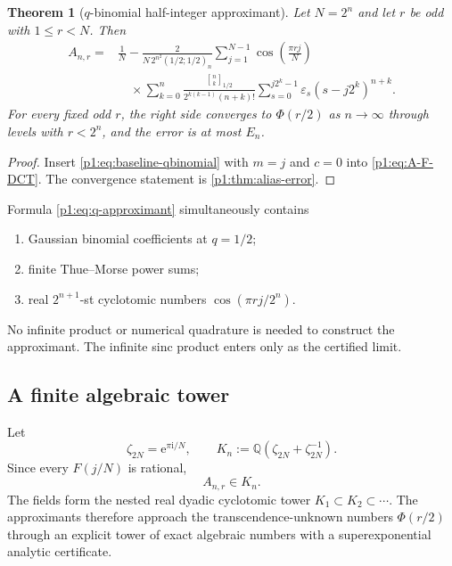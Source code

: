 \documentclass[11pt,oneside]{article}
\newtheorem{theorem}{Theorem}[section]
\theoremstyle{definition}
\theoremstyle{remark}
\newcommand{\Q}{\mathbb Q}
\newcommand{\e}{\mathrm e}
\newcommand{\ii}{\mathrm i}
\newcommand{\eps}{\varepsilon}
\newcommand{\PhiU}{\Phi}
\newcommand{\qbinom}[3]{\genfrac{[}{]}{0pt}{}{#1}{#2}_{#3}}
\begin{document}
\begin{theorem}[$q$-binomial half-integer approximant]\label{p1:thm:q-approximant}
Let $N=2^n$ and let $r$ be odd with $1\le r<N$.  Then
\begin{equation}\label{p1:eq:q-approximant}
\boxed{
\begin{aligned}
 A_{n,r}={}&\frac1N-
 \frac{2}{N\,2^{n^2}(1/2;1/2)_n}
 \sum_{j=1}^{N-1}\cos\!\left(\frac{\pi rj}{N}\right)\\
 &\quad\times\sum_{k=0}^{n}
 \frac{\qbinom{n}{k}{1/2}}
 {2^{k(k-1)}(n+k)!}
 \sum_{s=0}^{j2^k-1}\eps_s(s-j2^k)^{n+k}.
\end{aligned}}
\end{equation}
For every fixed odd $r$, the right side converges to $\PhiU(r/2)$ as
$n\to\infty$ through levels with $r<2^n$, and the error is at most $E_n$.
\end{theorem}

\begin{proof}
Insert \eqref{p1:eq:baseline-qbinomial} with $m=j$ and $c=0$ into
\eqref{p1:eq:A-F-DCT}.  The convergence statement is
\cref{p1:thm:alias-error}.
\end{proof}

\begin{remark}
Formula \eqref{p1:eq:q-approximant} simultaneously contains
\begin{enumerate}
 \item Gaussian binomial coefficients at $q=1/2$;
 \item finite Thue--Morse power sums;
 \item real $2^{n+1}$-st cyclotomic numbers
 $\cos(\pi rj/2^n)$.
\end{enumerate}
No infinite product or numerical quadrature is needed to construct the
approximant.  The infinite sinc product enters only as the certified limit.
\end{remark}

\subsection{A finite algebraic tower}

Let
\begin{equation}\label{p1:eq:cyclotomic-field}
 \zeta_{2N}=\e^{\pi\ii/N},
 \qquad
 K_n:=\Q(\zeta_{2N}+\zeta_{2N}^{-1}).
\end{equation}
Since every $F(j/N)$ is rational,
\begin{equation}\label{p1:eq:A-in-K}
 A_{n,r}\in K_n.
\end{equation}
The fields form the nested real dyadic cyclotomic tower
$K_1\subset K_2\subset\cdots$.  The approximants therefore approach the
transcendence-unknown numbers $\PhiU(r/2)$ through an explicit tower of exact
algebraic numbers with a superexponential analytic certificate.
\end{document}

